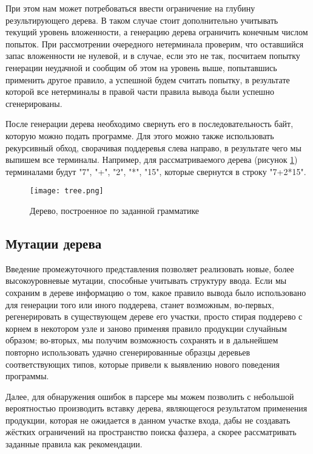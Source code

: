 При этом нам может потребоваться ввести ограничение на глубину результирующего дерева. В таком случае стоит дополнительно учитывать текущий уровень вложенности, а генерацию дерева ограничить конечным числом попыток. При рассмотрении очередного нетерминала проверим, что оставшийся запас вложенности не нулевой, и в случае, если это не так, посчитаем попытку генерации неудачной и сообщим об этом на уровень выше, попытавшись применить другое правило, а успешной будем считать попытку, в результате которой все нетерминалы в правой части правила вывода были успешно сгенерированы.

После генерации дерева необходимо свернуть его в последовательность байт, которую можно подать программе. Для этого можно также использовать рекурсивный обход, сворачивая поддеревья слева направо, в результате чего мы выпишем все терминалы. Например, для рассматриваемого дерева (рисунок \ref{fig:tree_folding}) терминалами будут "7", "+", "2", "*", "15", которые свернутся в строку "7+2*15".

\begin{figure}[h]
	\centering
	\texttt{[image: tree.png]}
	\caption{Дерево, построенное по заданной грамматике}
	\label{fig:tree_folding}
\end{figure}%

\subsection{Мутации дерева}

Введение промежуточного представления позволяет реализовать новые, более высокоуровневые мутации, способные учитывать структуру ввода. Если мы сохраним в дереве информацию о том, какое правило вывода было использовано для генерации того или иного поддерева, станет возможным, во-первых, регенерировать в существующем дереве его участки, просто стирая поддерево с корнем в некотором узле и заново применяя правило продукции случайным образом; во-вторых, мы получим возможность сохранять и в дальнейшем повторно использовать удачно сгенерированные образцы деревьев соответствующих типов, которые привели к выявлению нового поведения программы.

Далее, для обнаружения ошибок в парсере мы можем позволить с небольшой вероятностью производить вставку дерева, являющегося результатом применения продукции, которая не ожидается в данном участке входа, дабы не создавать жёстких ограничений на пространство поиска фаззера, а скорее рассматривать заданные правила как рекомендации.

